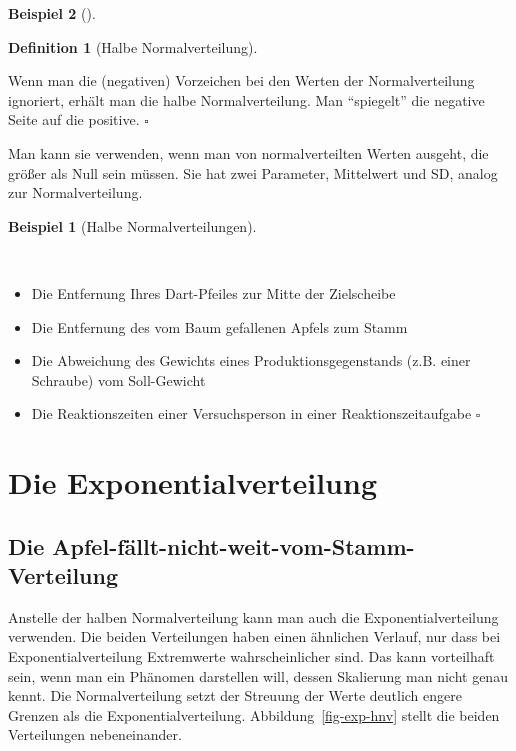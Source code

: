 \documentclass[
  ngerman,
  letterpaper,
  twoside,
  open=any]{scrbook}
\providecommand{\tightlist}{%
  \setlength{\itemsep}{0pt}\setlength{\parskip}{0pt}}\usepackage{longtable,booktabs,array}
\theoremstyle{definition}
\newtheorem{example}{Beispiel}[chapter]
\theoremstyle{plain}
\theoremstyle{definition}
\theoremstyle{definition}
\newtheorem{definition}{Definition}[chapter]
\theoremstyle{remark}
\begin{document}
\begin{example}[]
\begin{figure}[H]
\end{figure}%

\begin{definition}[Halbe
Normalverteilung]\protect\hypertarget{def-halbe-nv}{}\label{def-halbe-nv}

Wenn man die (negativen) Vorzeichen bei den Werten der Normalverteilung
ignoriert, erhält man die halbe Normalverteilung. Man \enquote{spiegelt}
die negative Seite auf die positive. \(\square\)

\end{definition}

Man kann sie verwenden, wenn man von normalverteilten Werten ausgeht,
die größer als Null sein müssen. Sie hat zwei Parameter, Mittelwert und
SD, analog zur Normalverteilung.

\begin{example}[Halbe
Normalverteilungen]\protect\hypertarget{exm-halbe-NV}{}\label{exm-halbe-NV}

~

\begin{itemize}
\tightlist
\item
  Die Entfernung Ihres Dart-Pfeiles zur Mitte der Zielscheibe
\item
  Die Entfernung des vom Baum gefallenen Apfels zum Stamm
\item
  Die Abweichung des Gewichts eines Produktionsgegenstands (z.B. einer
  Schraube) vom Soll-Gewicht
\item
  Die Reaktionszeiten einer Versuchsperson in einer Reaktionszeitaufgabe
  \(\square\)
\end{itemize}

\end{example}

\section{Die Exponentialverteilung}\label{die-exponentialverteilung}

\subsection{Die
Apfel-fällt-nicht-weit-vom-Stamm-Verteilung}\label{die-apfel-fuxe4llt-nicht-weit-vom-stamm-verteilung}

Anstelle der halben Normalverteilung kann man auch die
Exponentialverteilung verwenden. Die beiden Verteilungen haben einen
ähnlichen Verlauf, nur dass bei Exponentialverteilung Extremwerte
wahrscheinlicher sind. Das kann vorteilhaft sein, wenn man ein Phänomen
darstellen will, dessen Skalierung man nicht genau kennt. Die
Normalverteilung setzt der Streuung der Werte deutlich engere Grenzen
als die Exponentialverteilung. Abbildung~\ref{fig-exp-hnv} stellt die
beiden Verteilungen nebeneinander.


\end{example}
\end{document}
